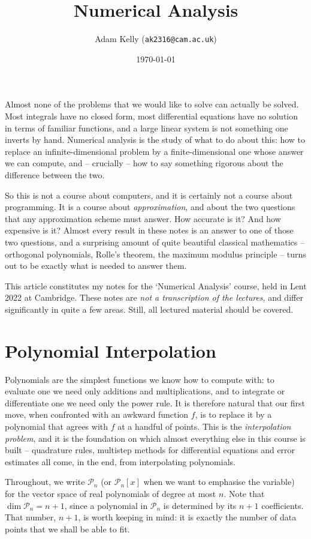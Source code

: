 \documentclass[a4paper]{scrartcl}
\title{Numerical Analysis}
\author{Adam Kelly (\texttt{ak2316@cam.ac.uk})}
\date{\today}
\newcommand{\Pn}[1]{\mathcal{P}_{#1}}
\begin{document}
\maketitle

Almost none of the problems that we would like to solve can actually be solved. Most integrals have no closed form, most differential equations have no solution in terms of familiar functions, and a large linear system is not something one inverts by hand. Numerical analysis is the study of what to do about this: how to replace an infinite-dimensional problem by a finite-dimensional one whose answer we can compute, and -- crucially -- how to say something rigorous about the difference between the two.

So this is not a course about computers, and it is certainly not a course about programming. It is a course about \emph{approximation}, and about the two questions that any approximation scheme must answer. How accurate is it? And how expensive is it? Almost every result in these notes is an answer to one of those two questions, and a surprising amount of quite beautiful classical mathematics -- orthogonal polynomials, Rolle's theorem, the maximum modulus principle -- turns out to be exactly what is needed to answer them.

This article constitutes my notes for the `Numerical Analysis' course, held in Lent 2022 at Cambridge. These notes are \emph{not a transcription of the lectures}, and differ significantly in quite a few areas. Still, all lectured material should be covered.


\tableofcontents


\section{Polynomial Interpolation}

Polynomials are the simplest functions we know how to compute with: to evaluate one we need only additions and multiplications, and to integrate or differentiate one we need only the power rule. It is therefore natural that our first move, when confronted with an awkward function $f$, is to replace it by a polynomial that agrees with $f$ at a handful of points. This is the \emph{interpolation problem}, and it is the foundation on which almost everything else in this course is built -- quadrature rules, multistep methods for differential equations and error estimates all come, in the end, from interpolating polynomials.

Throughout, we write $\Pn{n}$ (or $\Pn{n}[x]$ when we want to emphasise the variable) for the vector space of real polynomials of degree at most $n$. Note that $\dim \Pn{n} = n + 1$, since a polynomial in $\Pn{n}$ is determined by its $n + 1$ coefficients. That number, $n+1$, is worth keeping in mind: it is exactly the number of data points that we shall be able to fit.
\end{document}
